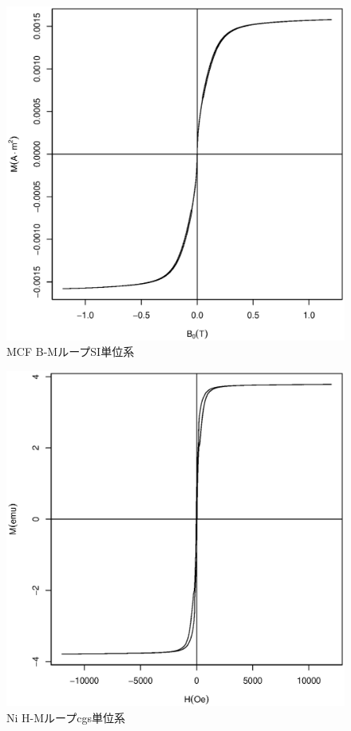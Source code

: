 \documentclass[12pt]{jarticle}
\begin{document}
  \begin{figure}[htb]
    \begin{center}
      \includegraphics[width=125mm]{aaa.eps}
    \end{center}
    \caption{MCF B-MループSI単位系}
    \label{fig:MCF_SI_BM}
  \end{figure}

  \begin{figure}[htb]
    \begin{center}
      \includegraphics[width=125mm]{MagCharNi_cgs.eps}
    \end{center}
    \caption{Ni H-Mループcgs単位系}
    \label{fig:Ni_cgs}
  \end{figure}
\end{document}
